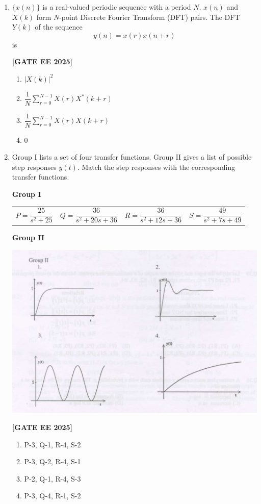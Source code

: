 \documentclass[12pt]{article}
\begin{document}
\begin{enumerate}[leftmargin=*, label=\textbf{Q.\arabic*:}]
\item $\{x(n)\}$ is a real-valued periodic sequence with a period $N$. $x(n)$ and $X(k)$ form $N$-point Discrete Fourier Transform (DFT) pairs. The DFT $Y(k)$ of the sequence
\[
y(n) = x(r) x(n + r)
\]
is
 
\noindent \textbf{[GATE EE 2025]}
\begin{enumerate}
  \item $|X(k)|^2 $
  \item $\dfrac{1}{N} \sum_{r=0}^{N-1} X(r) X^*(k+r) $
  \item $\dfrac{1}{N} \sum_{r=0}^{N-1} X(r) X(k+r) $
  \item $0$
\end{enumerate}

\item
Group I lists a set of four transfer functions. Group II gives a list of possible step responses $y(t)$. Match the step responses with the corresponding transfer functions.

\textbf{Group I}\vspace{0.2em}

\begin{tabular}{llll}
  $P = \dfrac{25}{s^2 + 25 }$ &
  $Q = \dfrac{36}{s^2 + 20s + 36}$ &
  $R = \dfrac{36}{s^2 + 12s + 36 }$ &
  $S = \dfrac{49}{s^2 + 7s + 49}$
\end{tabular}
\vspace{0.6em}

\textbf{Group II}
\begin{center}
\includegraphics[width=0.9\columnwidth]{figs/q38.png}
\end{center}
 
\noindent \textbf{[GATE EE 2025]}
\begin{enumerate}
  \item P-3, Q-1, R-4, S-2
  \item P-3, Q-2, R-4, S-1
  \item P-2, Q-1, R-4, S-3
  \item P-3, Q-4, R-1, S-2
\end{enumerate}


\end{enumerate}
\end{document}
